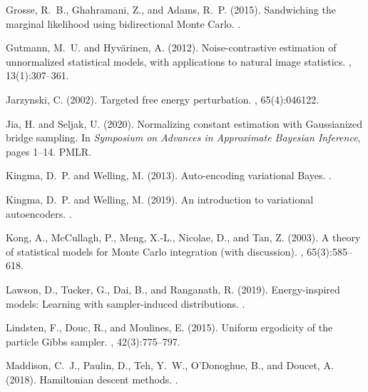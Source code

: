 \documentclass{article}
\newcommand{\1}{\mathds{1}}
\begin{document}
\begin{thebibliography}{50}
Grosse, R.~B., Ghahramani, Z., and Adams, R.~P. (2015).
\newblock Sandwiching the marginal likelihood using bidirectional {M}onte
  {C}arlo.
.

Gutmann, M.~U. and Hyv\"{a}rinen, A. (2012).
\newblock Noise-contrastive estimation of unnormalized statistical models, with
  applications to natural image statistics.
, 13(1):307--361.

Jarzynski, C. (2002).
\newblock Targeted free energy perturbation.
, 65(4):046122.

Jia, H. and Seljak, U. (2020).
\newblock Normalizing constant estimation with {G}aussianized bridge sampling.
\newblock In {\em Symposium on Advances in Approximate Bayesian Inference},
  pages 1--14. PMLR.

Kingma, D.~P. and Welling, M. (2013).
\newblock Auto-encoding variational {B}ayes.
.

Kingma, D.~P. and Welling, M. (2019).
\newblock An introduction to variational autoencoders.
.

Kong, A., McCullagh, P., Meng, X.-L., Nicolae, D., and Tan, Z. (2003).
\newblock A theory of statistical models for {M}onte {C}arlo integration (with
  discussion).
,
  65(3):585--618.

Lawson, D., Tucker, G., Dai, B., and Ranganath, R. (2019).
\newblock Energy-inspired models: Learning with sampler-induced distributions.
.

Lindsten, F., Douc, R., and Moulines, E. (2015).
\newblock Uniform ergodicity of the particle {G}ibbs sampler.
, 42(3):775--797.

Maddison, C.~J., Paulin, D., Teh, Y.~W., O'Donoghue, B., and Doucet, A. (2018).
\newblock Hamiltonian descent methods.
.


\end{thebibliography}
\end{document}

